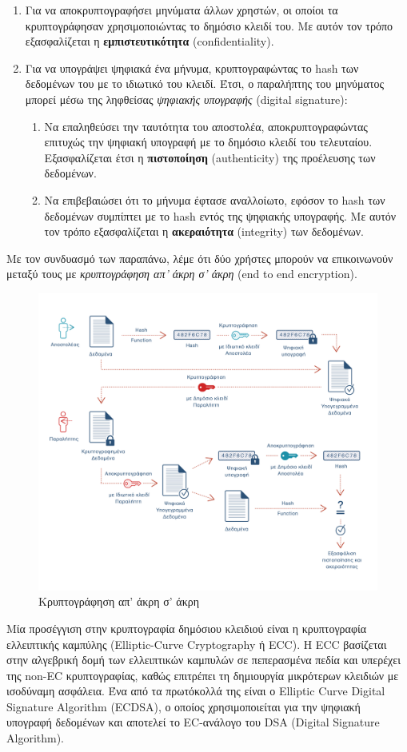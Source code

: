 \begin{enumerate}
	\item Για να αποκρυπτογραφήσει μηνύματα άλλων χρηστών, οι οποίοι τα κρυπτογράφησαν χρησιμοποιώντας το δημόσιο κλειδί του. Με αυτόν τον τρόπο εξασφαλίζεται η \textbf{εμπιστευτικότητα} (confidentiality).
	\item Για να υπογράψει ψηφιακά ένα μήνυμα, κρυπτογραφώντας το hash των δεδομένων του με το ιδιωτικό του κλειδί. Έτσι, ο παραλήπτης του μηνύματος μπορεί μέσω της ληφθείσας \textit{ψηφιακής υπογραφής} (digital signature):
	\begin{enumerate}
		\item Να επαληθεύσει την ταυτότητα του αποστολέα, αποκρυπτογραφώντας επιτυχώς την ψηφιακή υπογραφή με το δημόσιο κλειδί του τελευταίου. Εξασφαλίζεται έτσι η \textbf{πιστοποίηση} (authenticity) της προέλευσης των δεδομένων.
		\item Να επιβεβαιώσει ότι το μήνυμα έφτασε αναλλοίωτο, εφόσον το hash των δεδομένων συμπίπτει με το hash εντός της ψηφιακής υπογραφής. Με αυτόν τον τρόπο εξασφαλίζεται η \textbf{ακεραιότητα} (integrity) των δεδομένων.
	\end{enumerate}
\end{enumerate}

Με τον συνδυασμό των παραπάνω, λέμε ότι δύο χρήστες μπορούν να επικοινωνούν μεταξύ τους με \textit{κρυπτογράφηση απ' άκρη σ' άκρη} (end to end encryption).

\begin{figure}[H]
	\centering
	\includegraphics[width=.95\textwidth]{assets/figures/chapter-2/2.2.asymmetric-end-to-end-communication}
	\caption{Κρυπτογράφηση απ' άκρη σ' άκρη}
\end{figure}

 Μία προσέγγιση στην κρυπτογραφία δημόσιου κλειδιού είναι η κρυπτογραφία ελλειπτικής καμπύλης (Elliptic-Curve Cryptography ή ECC). Η ECC βασίζεται στην αλγεβρική δομή των ελλειπτικών καμπυλών σε πεπερασμένα πεδία και υπερέχει της non-EC κρυπτογραφίας, καθώς επιτρέπει τη δημιουργία μικρότερων κλειδιών με ισοδύναμη ασφάλεια. Ένα από τα πρωτόκολλά της είναι ο Elliptic Curve Digital Signature Algorithm (ECDSA), ο οποίος χρησιμοποιείται για την ψηφιακή υπογραφή δεδομένων και αποτελεί το EC-ανάλογο του DSA (Digital Signature Algorithm).\cite{2.2-ecdsa}